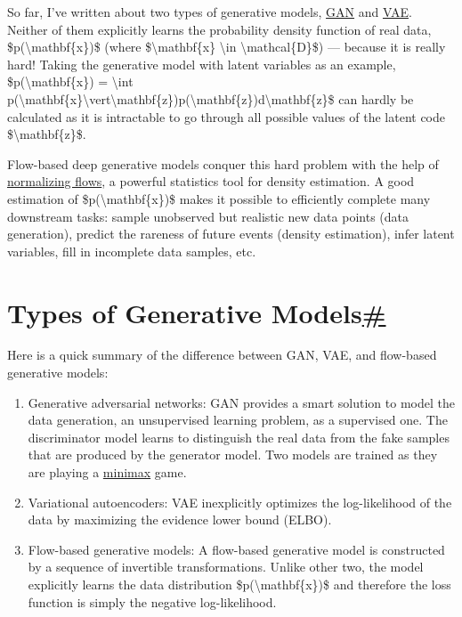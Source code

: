 So far, I've written about two types of generative models, \href{https://lilianweng.github.io/posts/2017-08-20-gan/}{GAN} and \href{https://lilianweng.github.io/posts/2018-08-12-vae/}{VAE}. Neither of them explicitly learns the probability density function of real data, \$p(\textbackslash mathbf\{x\})\$ (where \$\textbackslash mathbf\{x\} \textbackslash in \textbackslash mathcal\{D\}\$) --- because it is really hard! Taking the generative model with latent variables as an example, \$p(\textbackslash mathbf\{x\}) = \textbackslash int p(\textbackslash mathbf\{x\}\textbackslash vert\textbackslash mathbf\{z\})p(\textbackslash mathbf\{z\})d\textbackslash mathbf\{z\}\$ can hardly be calculated as it is intractable to go through all possible values of the latent code \$\textbackslash mathbf\{z\}\$.

Flow-based deep generative models conquer this hard problem with the help of \href{https://arxiv.org/abs/1505.05770}{normalizing flows}, a powerful statistics tool for density estimation. A good estimation of \$p(\textbackslash mathbf\{x\})\$ makes it possible to efficiently complete many downstream tasks: sample unobserved but realistic new data points (data generation), predict the rareness of future events (density estimation), infer latent variables, fill in incomplete data samples, etc.

\section{\texorpdfstring{Types of Generative Models\hyperref[types-of-generative-models]{\#}}{Types of Generative Models\#}}\label{types-of-generative-models}

Here is a quick summary of the difference between GAN, VAE, and flow-based generative models:

\begin{enumerate}
\tightlist
\item
  Generative adversarial networks: GAN provides a smart solution to model the data generation, an unsupervised learning problem, as a supervised one. The discriminator model learns to distinguish the real data from the fake samples that are produced by the generator model. Two models are trained as they are playing a \href{https://en.wikipedia.org/wiki/Minimax}{minimax} game.
\item
  Variational autoencoders: VAE inexplicitly optimizes the log-likelihood of the data by maximizing the evidence lower bound (ELBO).
\item
  Flow-based generative models: A flow-based generative model is constructed by a sequence of invertible transformations. Unlike other two, the model explicitly learns the data distribution \$p(\textbackslash mathbf\{x\})\$ and therefore the loss function is simply the negative log-likelihood.
\end{enumerate}

